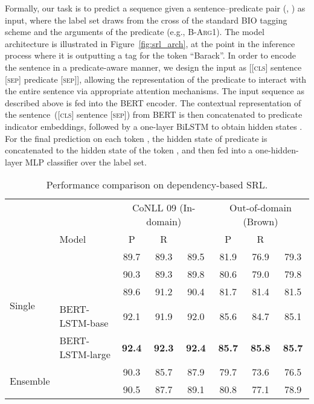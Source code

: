 \documentclass[11pt,a4paper]{article}
\begin{document}
Formally, our task is to predict a sequence  given a sentence--predicate pair (, ) as input, where the label set draws from the cross of the standard BIO tagging scheme and the arguments of the predicate (e.g., \textsc{B-Arg1}).
The model architecture is illustrated in Figure~\ref{fig:srl_arch}, at the point in the inference process where it is outputting a tag for the token ``Barack''.
In order to encode the sentence in a predicate-aware manner, we design the input as [[\textsc{cls}] sentence [\textsc{sep}] predicate [\textsc{sep}]], allowing the representation of the predicate to interact with the entire sentence via appropriate attention mechanisms.
The input sequence as described above is fed into the BERT encoder. 
The contextual representation of the sentence~([\textsc{cls}] sentence [\textsc{sep}]) from BERT is then concatenated to predicate indicator embeddings, followed by a one-layer BiLSTM to obtain hidden states . 
For the final prediction on each token , the hidden state of predicate  is concatenated to the hidden state of the token , and then fed into a one-hidden-layer MLP classifier over the label set.

\begin{table*}[t]
	\centering
	\small
	\begin{tabular}{ll ccc ccc}
		\toprule
		&  & \multicolumn{3}{c}{CoNLL 09 (In-domain)} &  \multicolumn{3}{c}{Out-of-domain (Brown)} \\ 
		\cmidrule(lr){3-5} \cmidrule(lr){6-8}
		&Model  & P & R &  & P & R &  \\
		\midrule
		\multirow{5}{*}{Single} & \citet{he2018syntax}  & 89.7 & 89.3 & 89.5 & 81.9 & 76.9 & 79.3 \\
		&   \citet{li2018unified} & 90.3 & 89.3 & 89.8 & 80.6 & 79.0 & 79.8 \\
		&	\citet{li2019dependency}  & 89.6 & 91.2 & 90.4 & 81.7 & 81.4 & 81.5 \\  \cmidrule{2-8}
		& BERT-LSTM-base & 92.1 & 91.9 & 92.0 & 85.6 & 84.7 & 85.1 \\
		& BERT-LSTM-large & \textbf{92.4} & \textbf{92.3} & \textbf{92.4} & \textbf{85.7} & \textbf{85.8 } & \textbf{85.7} \\
		\midrule
		
		\multirow{2}{*}{Ensemble} &	\citet{roth2016neural}  &90.3 & 85.7 & 87.9 & 79.7 & 73.6 & 76.5 \\
		&	\citet{marcheggiani2017encoding}  & 90.5 & 87.7 & 89.1 & 80.8 & 77.1 & 78.9 \\ 
		\bottomrule
	\end{tabular}
	\caption{Performance comparison on dependency-based SRL.\label{res:conll09}}
\end{table*}
\end{document}
